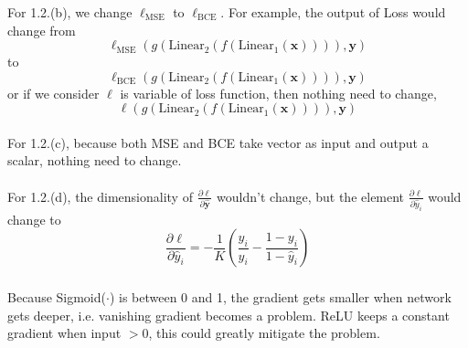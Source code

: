 \documentclass[a4paper]{article}
\begin{document}
\subsubsection{} %
For 1.2.(b), we change $\ell_\text{MSE}$ to $\ell_\text{BCE}$. For example, the output of Loss would change from
$$\ell_{\text{MSE}}(g(\text{Linear}_2(f(\text{Linear}_1(\bm{x})))), \bm{y})$$
to
$$\ell_{\text{BCE}}(g(\text{Linear}_2(f(\text{Linear}_1(\bm{x})))), \bm{y})$$
or if we consider $\ell$ is variable of loss function, then nothing need to change,
$$\ell(g(\text{Linear}_2(f(\text{Linear}_1(\bm{x})))), \bm{y})$$
\\
For 1.2.(c), because both MSE and BCE take vector as input and output a scalar, nothing need to change. \\\\
For 1.2.(d), the dimensionality of $\frac{\partial{\ell}}{\partial{\bm{\hat{y}}}}$ wouldn't change, but the element $\frac{\partial{\ell}}{\partial{\hat{y}_i}}$ would change to
$$\frac{\partial{\ell}}{\partial{\hat{y}_i}}=-\frac{1}{K}(\frac{y_i}{\hat{y}_i}-\frac{1-y_i}{1-\hat{y}_i})$$

\subsubsection{} %
Because Sigmoid($\cdot$) is between 0 and 1, the gradient gets smaller when network gets deeper, i.e. vanishing gradient becomes a problem. ReLU keeps a constant gradient when input $>0$, this could greatly mitigate the problem.
\end{document}
